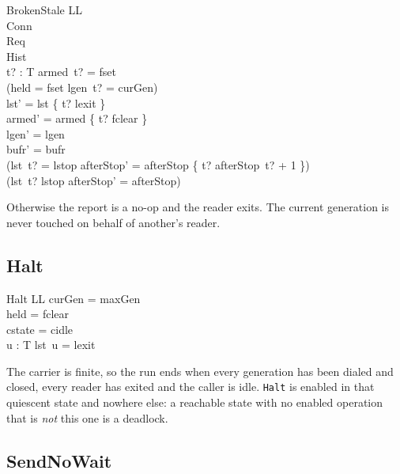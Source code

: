 \documentclass[a4paper,10pt,fleqn]{article}
\begin{document}
\begin{schema}{BrokenStale}
  \Delta LL \\
  \Xi Conn \\
  \Xi Req \\
  \Xi Hist \\
  t? : T
\where
  armed~t? = fset \\
  \lnot (held = fset \land lgen~t? = curGen) \\
  lst' = lst \oplus \{ t? \mapsto lexit \} \\
  armed' = armed \oplus \{ t? \mapsto fclear \} \\
  lgen' = lgen \\
  bufr' = bufr \\
  (lst~t? = lstop \implies
    afterStop' = afterStop \oplus \{ t? \mapsto afterStop~t? + 1 \}) \\
  (lst~t? \neq lstop \implies afterStop' = afterStop)
\end{schema}

Otherwise the report is a no-op and the reader exits.  The current generation is never touched on behalf of another's reader.

\subsection{Halt}

\begin{schema}{Halt}
  \Xi LL
\where
  curGen = maxGen \\
  held = fclear \\
  cstate = cidle \\
  \forall u : T \spot lst~u = lexit
\end{schema}

The carrier is finite, so the run ends when every generation has been dialed and closed, every reader has exited and the caller is idle.  \texttt{Halt} is enabled in that quiescent state and nowhere else: a reachable state with no enabled operation that is \emph{not} this one is a deadlock.


\subsection{SendNoWait}
\end{document}
